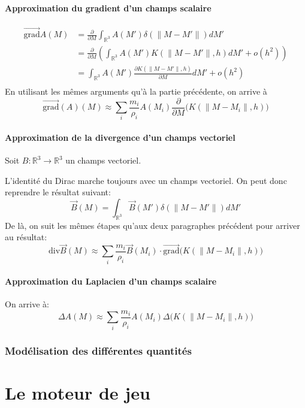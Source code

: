\documentclass[a4paper,10pt]{report}
\begin{document}
\newpage

\subsubsection{Approximation du gradient d'un champs scalaire}
\begin{align*}
 \vec{\text{grad}}A(M) &= \frac{\partial}{\partial M}\int_{\mathbb{R}^3} A(M')\delta(\lVert M - M' \rVert)dM' \\
      &= \frac{\partial}{\partial M}\left (\int_{\mathbb{R}^3} A(M') K(\lVert M - M' \rVert, h)dM' + o(h^2) \right) \\
      &= \int_{\mathbb{R}^3} A(M')\frac{\partial K(\lVert M - M' \rVert, h)}{\partial M}dM' +o(h^2)\\
\end{align*}
En utilisant les mêmes arguments qu'à la partie précédente, on arrive à
$$
\boxed{ \vec{\text{grad}}(A)(M) \approx \sum_i \frac{m_i}{\rho_i}A(M_i) \frac{\partial}{\partial M} \biggl( K(\lVert M - M_i \rVert, h) \biggl ) }
$$

\subsubsection{Approximation de la divergence d'un champs vectoriel}
Soit $B : \mathbb{R}^3 \to \mathbb{R}^3$ un champs vectoriel.

L'identité du Dirac marche toujours avec un champs vectoriel. On peut donc reprendre le résultat  suivant:
$$\vec{B}(M) = \int_{\mathbb{R}^3} \vec{B}(M')\delta(\lVert M - M' \rVert)dM'$$
De là, on suit les mêmes étapes qu'aux deux paragraphes précédent pour arriver au résultat:
$$
\boxed{ \text{div}\vec{B}(M) \approx \sum_i \frac{m_i}{\rho_i}\vec{B}(M_i) \cdot \vec{\text{grad}} \biggl(K(\lVert M - M_i \rVert, h)\biggl) }
$$

\subsubsection{Approximation du Laplacien d'un champs scalaire}
On arrive à:
$$
\boxed{ \Delta A (M) \approx \sum_i \frac{m_i}{\rho_i}A(M_i) \Delta \biggl(K(\lVert M - M_i \rVert, h)\biggl) }
$$

\subsection{Modélisation des différentes quantités}

\chapter{Le moteur de jeu}
\end{document}
